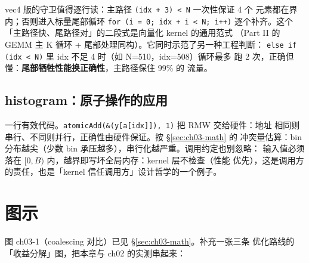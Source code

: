

vec4 版的守卫值得逐行读：主路径 \texttt{(idx + 3) < N} 一次性保证 4 个
元素都在界内；否则进入标量尾部循环 \texttt{for (i = 0; idx + i < N; i++)}
逐个补齐。这个「主路径快、尾路径对」的二段式是向量化 kernel 的通用范式
（Part II 的 GEMM 主 K 循环 + 尾部处理同构）。它同时示范了另一种工程判断：
\texttt{else if (idx < N)} 里 idx 不足 4 时（如 N=510，idx=508）循环最多
跑 2 次，正确但慢：\textbf{尾部牺牲性能换正确性}，主路径保住 99\% 的
流量。

\subsection{histogram：原子操作的应用}



一行有效代码。\texttt{atomic\allowbreak{}Add\allowbreak{}(\&\allowbreak{}(y[a[idx]]),\allowbreak{} 1)} 把 RMW 交给硬件：地址
相同则串行、不同则并行，正确性由硬件保证。按 \S\ref{sec:ch03-math} 的
冲突量估算：bin 分布越尖（少数 bin 承压越多），串行化越严重。调用约定也别忽略：
输入值必须落在 $[0, B)$ 内，越界即写坏全局内存：kernel 层不检查（性能
优先），这是调用方的责任，也是「kernel 信任调用方」设计哲学的一个例子。

\section{图示}

图 ch03-1（coalescing 对比）已见 \S\ref{sec:ch03-math}。补充一张三条
优化路线的「收益分解」图，把本章与 ch02 的实测串起来：


